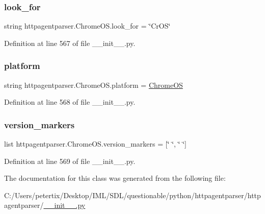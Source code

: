 \subsubsection{\texorpdfstring{look\+\_\+for}{look\_for}}
{\footnotesize\ttfamily string httpagentparser.\+Chrome\+O\+S.\+look\+\_\+for = \char`\"{}Cr\+OS\char`\"{}\hspace{0.3cm}{\ttfamily [static]}}



Definition at line 567 of file \+\_\+\+\_\+init\+\_\+\+\_\+.\+py.

\hypertarget{classhttpagentparser_1_1_chrome_o_s_a9e040ea82b5f9ebb910f44b88fb3c645}{}\label{classhttpagentparser_1_1_chrome_o_s_a9e040ea82b5f9ebb910f44b88fb3c645} 
\subsubsection{\texorpdfstring{platform}{platform}}
{\footnotesize\ttfamily string httpagentparser.\+Chrome\+O\+S.\+platform = \textquotesingle{} \hyperlink{classhttpagentparser_1_1_chrome_o_s}{Chrome\+OS}\textquotesingle{}\hspace{0.3cm}{\ttfamily [static]}}



Definition at line 568 of file \+\_\+\+\_\+init\+\_\+\+\_\+.\+py.

\hypertarget{classhttpagentparser_1_1_chrome_o_s_a0fab6783e21ada3b769411d39b60759e}{}\label{classhttpagentparser_1_1_chrome_o_s_a0fab6783e21ada3b769411d39b60759e} 
\subsubsection{\texorpdfstring{version\+\_\+markers}{version\_markers}}
{\footnotesize\ttfamily list httpagentparser.\+Chrome\+O\+S.\+version\+\_\+markers = \mbox{[}\char`\"{} \char`\"{}, \char`\"{} \char`\"{}\mbox{]}\hspace{0.3cm}{\ttfamily [static]}}



Definition at line 569 of file \+\_\+\+\_\+init\+\_\+\+\_\+.\+py.



The documentation for this class was generated from the following file\+:\begin{DoxyCompactItemize}
\item 
C\+:/\+Users/petertix/\+Desktop/\+I\+M\+L/\+S\+D\+L/questionable/python/httpagentparser/httpagentparser/\hyperlink{____init_____8py}{\+\_\+\+\_\+init\+\_\+\+\_\+.\+py}\end{DoxyCompactItemize}

